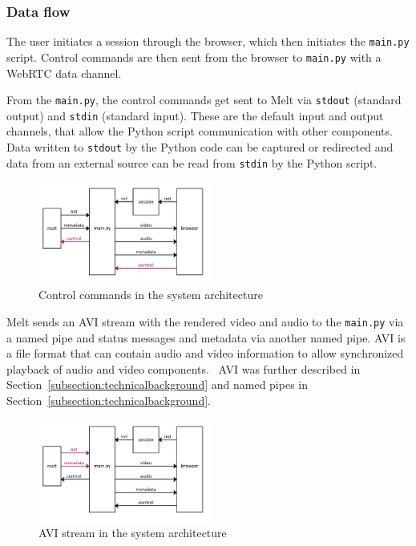 \documentclass[../MasterThesis.tex]{subfiles}
\begin{document}
\subsubsection{Data flow}

The user initiates a session through the browser, which then initiates the \texttt{main.py} script.
Control commands are then sent from the browser to \texttt{main.py} with a WebRTC data channel.

From the \texttt{main.py}, the control commands get sent to Melt via \texttt{stdout} (standard output) and \texttt{stdin} (standard input). These are the default input and output channels, that allow the Python script communication with other components.
Data written to \texttt{stdout} by the Python code can be captured or redirected and data from an external source can be read from \texttt{stdin} by the Python script. \cite{python}

\begin{figure}[H]
	\centering
	\includegraphics[width=0.5\textwidth]{IM_control.png}
	\caption{Control commands in the system architecture}
	
\end{figure}


Melt sends an AVI stream with the rendered video and audio to the \texttt{main.py} via a named pipe and status messages and metadata via another named pipe.
AVI is a file format that can contain audio and video information to allow synchronized playback of audio and video components.~\cite{avi} AVI was further described in Section~\ref{subsection:technicalbackground} and named pipes in Section~\ref{subsection:technicalbackground}.

\begin{figure}[H]
	\centering
	\includegraphics[width=0.5\textwidth]{IM_avi.png}
	\caption{AVI stream in the system architecture}
\end{figure}
\end{document}
